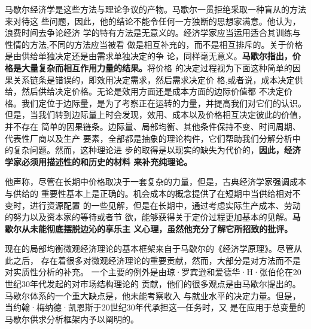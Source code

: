马歇尔经济学是这些方法与理论争议的产物。马歇尔一贯拒绝采取一种盲从的方法来对待这
些问题，因此，他的结论不能令任何一方独断的思想家满意。他认为，浪费时间去争论经济
学的特有方法是无意义的。经济学家应当运用适合其训练与性情的方法,不同的方法应当被看
做是相互补充的，而不是相互排斥的。关于价格是由供给单独决定还是由需求单独决定的争
论，同样毫无意义。\textbf{马歇尔指出，价格是大量复杂而相互作用力量的结果。}将价格
的决定过程视为下面这种简单的因果关系链条是错误的，即效用决定需求，然后需求决定价
格,或者说，成本决定供给，然后供给决定价格。无论是效用方面还是成本方面的边际价值都
不决定价格。我们定位于边际量，是为了考察正在运转的力量，并提高我们对它们的认识。
但是，当我们转到边际量上时会发现，效用、成本以及价格相互决定彼此的价值，并不存在
简单的因果链条。边际量、局部均衡、其他条件保持不变、时间周期、代表性厂商以及生产
要素，全部都是抽象的理论构件，它们帮助我们分解分析中的复杂问题。然而，这种理论进
步的取得是以现实的缺失为代价的，\textbf{因此，经济学家必须用描述性的和历史的材料
  来补充纯理论。}

他声称，尽管在长期中价格取决于一套复杂的力量，但是，古典经济学家强调成本与供给的
重要性基本上是正确的。机会成本的概念提供了在短期中当供给相对不变时，进行资源配置
的一些见解，但是在长期中，通过考虑实际生产成本、劳动的努力以及资本家的等待或者节
欲，能够获得关于定价过程更加基本的见解。\textbf{马歇尔从未能彻底摆脱边沁的享乐主
  义心理，虽然他充分了解它所招致的批评。}

现在的局部均衡微观经济理论的基本框架来自于马歇尔的《经济学原理》。尽管从此之后，
存在着很多对微观经济理论的重要贡献，然而，大部分是对方法而不是对实质性分析的补充。
一个主要的例外是由琼·罗宾逊和爱德华·H·张伯伦在20世纪30年代发起的对市场结构理论的
贡献，他们的很多观点是由马歇尔提出的。马歇尔体系的一个重大缺点是，他未能考察收入
与就业水平的决定力量。但是，当约翰·梅纳德·凯恩斯于20世纪30年代承担这一任务时，又
是在应用于总变量的马歇尔供求分析框架内予以阐明的。



